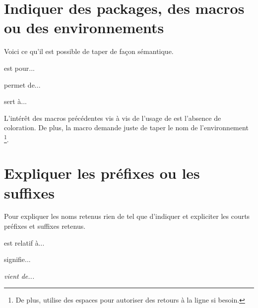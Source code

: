 

\usepackage[lang = french]{../main/main}
\usepackage{../listing/listing}
\usepackage{../rem-exa/rem-exa}


\usepackage{macroenv}




\section{Indiquer des packages, des macros ou des environnements}

Voici ce qu'il est possible de taper de façon sémantique.

\begin{bdoclatex}[sbs]
 est pour...

 permet de...

 sert à...
\end{bdoclatex}


\begin{bdocrem}
    L'intérêt des macros précédentes vis à vis de l'usage de  est l'absence de coloration.
    De plus, la macro  demande juste de taper le nom de l'environnement
    \footnote{
        De plus,  utilise des espaces pour autoriser des retours à la ligne si besoin.
    }.
\end{bdocrem}




\section{Expliquer les préfixes ou les suffixes}

Pour expliquer les noms retenus rien de tel que d'indiquer et expliciter les courts préfixes et suffixes retenus.

\begin{bdoclatex}[sbs]
 est relatif à...

 signifie...

\emph{ vient de...}
\end{bdoclatex}



